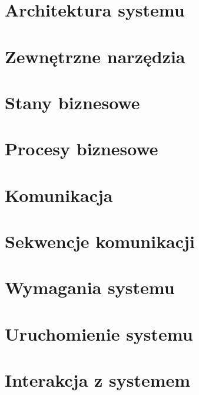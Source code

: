 \documentclass[../praca-dyplomowa.tex]{subfiles}
\begin{document}
\section{Architektura systemu}
\label{architecture}


\section{Zewnętrzne narzędzia}



\section{Stany biznesowe}


\section{Procesy biznesowe}


\section{Komunikacja}


\section{Sekwencje komunikacji}


\section{Wymagania systemu}


\section{Uruchomienie systemu}


\section{Interakcja z systemem}

\end{document}
